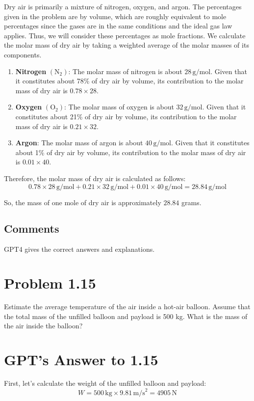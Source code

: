 \documentclass[12pt]{article}
\begin{document}
Dry air is primarily a mixture of nitrogen, oxygen, and argon. The percentages given in the problem are by volume, which are roughly equivalent to mole percentages since the gases are in the same conditions and the ideal gas law applies. Thus, we will consider these percentages as mole fractions. We calculate the molar mass of dry air by taking a weighted average of the molar masses of its components.

\begin{enumerate}
    \item \textbf{Nitrogen} $\left(\mathrm{N}_2\right)$: The molar mass of nitrogen is about $28 \, \text{g/mol}$. Given that it constitutes about 78\% of dry air by volume, its contribution to the molar mass of dry air is $0.78 \times 28$.
    
    \item \textbf{Oxygen} $\left(\mathrm{O}_2\right)$: The molar mass of oxygen is about $32 \, \text{g/mol}$. Given that it constitutes about 21\% of dry air by volume, its contribution to the molar mass of dry air is $0.21 \times 32$.
    
    \item \textbf{Argon}: The molar mass of argon is about $40 \, \text{g/mol}$. Given that it constitutes about 1\% of dry air by volume, its contribution to the molar mass of dry air is $0.01 \times 40$.
\end{enumerate}

Therefore, the molar mass of dry air is calculated as follows:
\[
0.78 \times 28 \, \text{g/mol} + 0.21 \times 32 \, \text{g/mol} + 0.01 \times 40 \, \text{g/mol} = 28.84 \, \text{g/mol}
\]

So, the mass of one mole of dry air is approximately $28.84$ grams.

\subsection*{Comments}

GPT4 gives the correct answers and explanations.

\section*{Problem 1.15}
Estimate the average temperature of the air inside a hot-air balloon. Assume that the total mass of the unfilled balloon and payload is 500 kg. What is the mass of the air inside the balloon?

\section*{GPT's Answer to 1.15}
First, let's calculate the weight of the unfilled balloon and payload:
\[ W = 500 \, \text{kg} \times 9.81 \, \text{m/s}^2 = 4905 \, \text{N} \]
\end{document}
